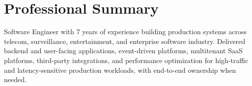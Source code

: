 \section*{Professional Summary}

\newcommand{\summarysoftware}{
	Software Engineer with 7 years of experience building production systems across telecom\iftoggle{showRoleBfi}{, finance}{}, surveillance, entertainment, and enterprise software industry. Delivered backend and user-facing applications, event-driven platforms, multitenant SaaS platforms, third-party integrations, and performance optimization for high-traffic and latency-sensitive production workloads, with end-to-end ownership when needed.
}

\newcommand{\summarybackend}{
	Backend-focused Software Engineer with 7 years of experience building applications, APIs, microservices, and event-driven systems across telecom\iftoggle{showRoleBfi}{, finance}{}, surveillance, entertainment, and enterprise software industry. Experienced with multitenant SaaS platforms, third-party integrations, and performance optimization for high-traffic and latency-sensitive production workloads, with end-to-end ownership when needed.
}

{}
{\summarysoftware}
